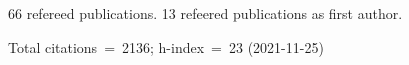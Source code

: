 66 refereed publications. 13 refeered publications as first author.

Total citations~=~2136; h-index~=~23 (2021-11-25)